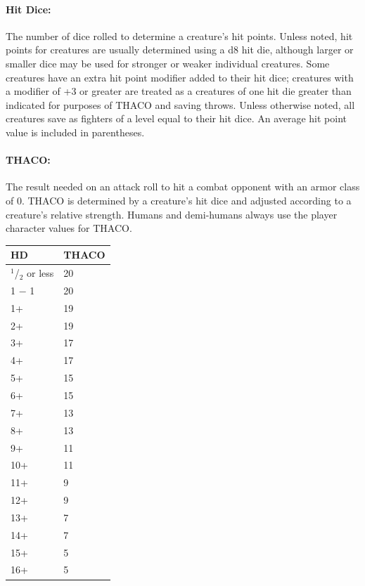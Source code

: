 \begin{multicols}{2}
\paragraph{Hit Dice:} The number of dice rolled to determine a creature's hit points. Unless noted, hit points for creatures are usually determined using a d8 hit die, although larger or smaller dice may be used for stronger or weaker individual creatures.  Some creatures have an extra hit point modifier added to their hit dice; creatures with a modifier of +3 or greater are treated as a creatures of one hit die greater than indicated for purposes of THACO and saving throws. Unless otherwise noted, all creatures save as fighters of a level equal to their hit dice. An average hit point value is included in parentheses.

\paragraph{THACO:} The result needed on an attack roll to hit a combat opponent with an armor class of 0. THACO is determined by a creature's hit dice and adjusted according to a creature's relative strength. Humans and demi-humans always use the player character values for THACO.

\noindent
\begin{minipage}{\columnwidth}

\label{creatureTHACO}
\noindent
\begin{tabular}{|p{}|p{}|}
\hline
HD	& THACO \\
\hline\hline
\rowcolor[gray]{.9}$^1$/$_2$ or less	& 20 \\
1 $-$ 1	& 20 \\
\rowcolor[gray]{.9}1+		& 19 \\
2+		& 19 \\
\rowcolor[gray]{.9}3+		& 17 \\
4+		& 17 \\
\rowcolor[gray]{.9}5+		& 15 \\
6+		& 15 \\
\rowcolor[gray]{.9}7+		& 13 \\
8+		& 13 \\
\rowcolor[gray]{.9}9+		& 11 \\
10+		& 11 \\
\rowcolor[gray]{.9}11+		& 9 \\
12+		& 9 \\
\rowcolor[gray]{.9}13+		& 7 \\
14+		& 7 \\
\rowcolor[gray]{.9}15+		& 5 \\
16+		& 5 \\
\hline
\end{tabular}


\end{minipage}
\end{multicols}

